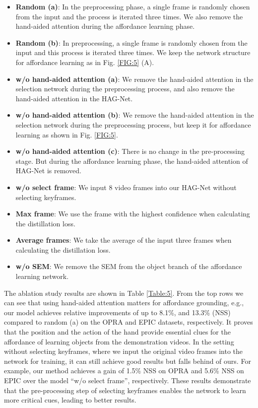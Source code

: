 \documentclass[journal,twoside]{IEEEtran}
\begin{document}
\begin{itemize}
\item []
\textbf{Random (a)}: In the preprocessing phase, a single frame is randomly chosen from the input and the process is iterated three times. We also remove the hand-aided attention during the affordance learning phase.

\item []
\textbf{Random (b)}: In preprocessing, a single frame is randomly chosen from the input and this process is iterated three times. We keep the network structure for affordance learning as in Fig. \ref{FIG:5} (A).

\item []
\textbf{w/o hand-aided attention (a)}: We remove the hand-aided attention in the selection network during the preprocessing process, and also remove the hand-aided attention in the HAG-Net.

\item []
\textbf{w/o hand-aided attention (b)}: We remove the hand-aided attention in the selection network during the preprocessing process, but keep it for affordance learning as shown in Fig. \ref{FIG:5}.

\item []
\textbf{w/o hand-aided attention (c)}: There is no change in the pre-processing stage. But during the affordance learning phase, the hand-aided attention of HAG-Net is removed.

\item[]
\textbf{w/o select frame}: We input 8 video frames into our HAG-Net without selecting keyframes.

\item []
\textbf{Max frame}: We use the frame with the highest confidence when calculating the distillation loss.

\item []
\textbf{Average frames}: We take the average of the input three frames when calculating the distillation loss.

\item []
\textbf{w/o SEM}: We remove the SEM from the object branch of the affordance learning network.
\end{itemize}

\par The ablation study results are shown in Table \ref{Table:5}. From the top rows we can see that using hand-aided attention matters for affordance grounding, e.g., our model achieves relative improvements of up to 8.1\%, and 13.3\% (NSS) compared to random (a) on the OPRA \cite{demo2vec2018cvpr} and EPIC \cite{Damen2018EPICKITCHENS} datasets, respectively. It proves that the position and the action of the hand provide essential clues for the affordance of learning objects from the demonstration videos. In the setting without selecting keyframes, where we input the original video frames into the network for training, it can still achieve good results but falls behind of ours. For example, our method achieves a gain of 1.5\% NSS on OPRA and 5.6\% NSS on EPIC over the model ``w/o select frame'', respectively. These results demonstrate that the pre-processing step of selecting keyframes enables the network to learn more critical cues, leading to better results.
\end{document}
